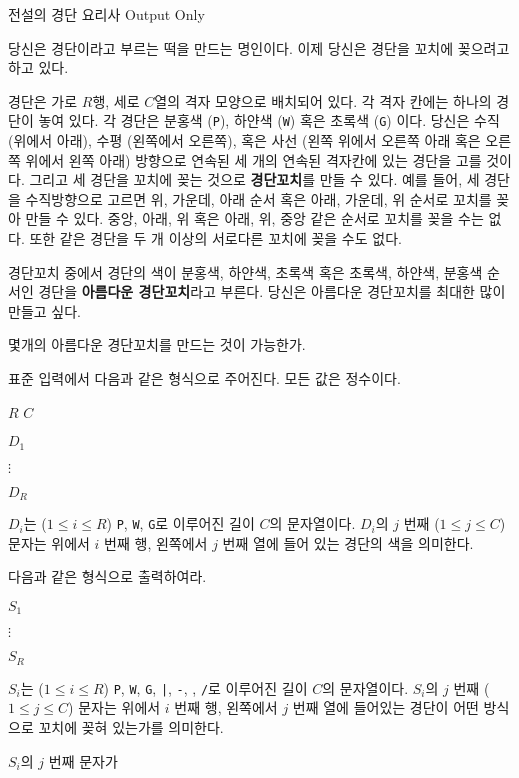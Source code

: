 \begin{problem}{전설의 경단 요리사}
	{}{Output Only}
	{}{}{}
	
	당신은 경단이라고 부르는 떡을 만드는 명인이다. 이제 당신은 경단을 꼬치에 꽂으려고 하고 있다.
	
	경단은 가로 $R$행, 세로 $C$열의 격자 모양으로 배치되어 있다. 각 격자 칸에는 하나의 경단이 놓여 있다. 각 경단은 분홍색 (\texttt{P}), 하얀색 (\texttt{W}) 혹은 초록색 (\texttt{G}) 이다. 당신은 수직 (위에서 아래), 수평 (왼쪽에서 오른쪽), 혹은 사선 (왼쪽 위에서 오른쪽 아래 혹은 오른쪽 위에서 왼쪽 아래) 방향으로 연속된 세 개의 연속된 격자칸에 있는 경단을 고를 것이다. 그리고 세 경단을 꼬치에 꽂는 것으로 \textbf{경단꼬치}를 만들 수 있다. 예를 들어, 세 경단을 수직방향으로 고르면 위, 가운데, 아래 순서 혹은 아래, 가운데, 위 순서로 꼬치를 꽂아 만들 수 있다. 중앙, 아래, 위 혹은 아래, 위, 중앙 같은 순서로 꼬치를 꽂을 수는 없다. 또한 같은 경단을 두 개 이상의 서로다른 꼬치에 꽂을 수도 없다.
	
	경단꼬치 중에서 경단의 색이 분홍색, 하얀색, 초록색 혹은 초록색, 하얀색, 분홍색 순서인 경단을 \textbf{아름다운 경단꼬치}라고 부른다. 당신은 아름다운 경단꼬치를 최대한 많이 만들고 싶다.
	
	몇개의 아름다운 경단꼬치를 만드는 것이 가능한가.

\InputFile

표준 입력에서 다음과 같은 형식으로 주어진다. 모든 값은 정수이다.

$R$ $C$

$D_1$

$\vdots$

$D_R$

$D_i$는 ($1 \le i \le R$) \texttt{P}, \texttt{W}, \texttt{G}로 이루어진 길이 $C$의 문자열이다. $D_i$의 $j$ 번째 ($1 \le j \le C$) 문자는 위에서 $i$ 번째 행, 왼쪽에서 $j$ 번째 열에 들어 있는 경단의 색을 의미한다.

\OutputFile

다음과 같은 형식으로 출력하여라.

$S_1$

$\vdots$

$S_R$

$S_i$는 ($1 \le i \le R$) \texttt{P}, \texttt{W}, \texttt{G}, \texttt{|}, \texttt{-}, \texttt{}, \texttt{/}로 이루어진 길이 $C$의 문자열이다. $S_i$의 $j$ 번째 ($1 \le j \le C$) 문자는 위에서 $i$ 번째 행, 왼쪽에서 $j$ 번째 열에 들어있는 경단이 어떤 방식으로 꼬치에 꽂혀 있는가를 의미한다.

$S_i$의 $j$ 번째 문자가


\end{problem}
